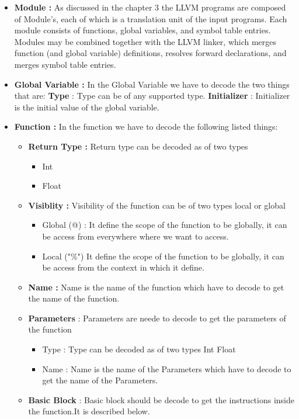 \documentclass[openany]{book}
\begin{document}
\begin{itemize}
	\item \textbf{Module :} As discussed in the chapter 3 the LLVM programs are composed of Module's, each of which is a translation unit of the input programs. Each module consists of functions, global variables, and symbol table entries. Modules may be combined together with the LLVM linker, which merges function (and global variable) definitions, resolves forward declarations, and merges symbol table entries.
	\item  \textbf{Global Variable :} In the Global Variable we have to decode the two things that are:
	\subitem \textbf{Type} : Type can be of any supported type.
	\subitem \textbf{Initializer} : Initializer is the initial value of the global variable.\newpage
	\item  \textbf{Function :} In the function we have to decode the following listed things:
	\begin{itemize}
		\item \textbf{Return Type : } Return type can be decoded as of two types
		\begin{itemize}
			\item Int
			\item Float
		\end{itemize}
		\item \textbf{Visiblity : } Visibility of the function can be of two types local or global
		\begin{itemize}
			\item Global (@) : It define the scope of the function to be globally, it can be access from everywhere where we want to access.
			\item Local ("\%") It define the scope of the function to be globally, it can be access from the context in which it define.
		\end{itemize}
		\item \textbf{Name :} Name is the name of the function which have to decode to get the name of the function.
		\item \textbf{Parameters} : Parameters are neede to decode to get the parameters of the function
		\begin{itemize}
			\item Type : Type can be decoded as of two types
			\subitem Int
			\subitem Float
			\item Name : Name is the name of the Parameters which have to decode to get the name of the Parameters.
		\end{itemize}
		\item \textbf{Basic Block} : Basic block should be decode to get the instructions inside the function.It is described below.

\end{itemize}
\end{itemize}
\end{document}
